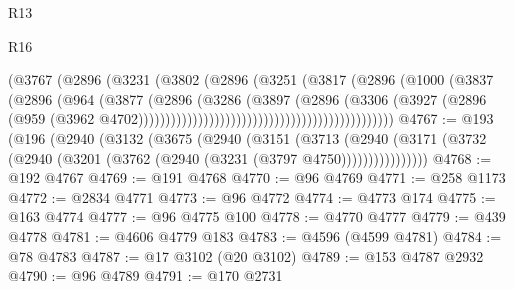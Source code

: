 \begin{lexlean}{R13}
\begin{lexlean}{R16}
\begin{coremodule}
{{{{{{{{{{{{{{{{{{{{{{{{{{{{{{{{{{{{{{{{{{{{{{{{{{{{{{{{{{{{{{{{{{{{{{{{{{{{{{{{{{{{{{{{{{{{{{{{{{{{{{{{{{{{{{{{{                                                      (@3767
                                                        (@2896
                                                          (@3231
                                                            (@3802
                                                              (@2896
                                                                (@3251
                                                                  (@3817
                                                                    (@2896
                                                                      (@1000
                                                                        (@3837
                                                                          (@2896
                                                                            (@964
                                                                              (@3877
                                                                                (@2896
                                                                                  (@3286
                                                                                    (@3897
                                                                                      (@2896
                                                                                        (@3306
                                                                                          (@3927
                                                                                            (@2896
                                                                                              (@959
                                                                                                (@3962
                                                                                                  @4702)))))))))))))))))))))))))))))))))))))))))))))))
@4767 := @193
    (@196
      (@2940
        (@3132
          (@3675
            (@2940
              (@3151
                (@3713
                  (@2940
                    (@3171 (@3732 (@2940 (@3201 (@3762 (@2940 (@3231 (@3797 @4750))))))))))))))))
@4768 := @192 @4767
@4769 := @191 @4768
@4770 := @96 @4769
@4771 := @258 @1173
@4772 := @2834 @4771
@4773 := @96 @4772
@4774 := @4773 @174
@4775 := @163 @4774
@4777 := @96 @4775 @100
@4778 := @4770 @4777
@4779 := @439 @4778
@4781 := @4606 @4779 @183
@4783 := @4596 (@4599 @4781)
@4784 := @78 @4783
@4787 := @17 @3102 (@20 @3102)
@4789 := @153 @4787 @2932
@4790 := @96 @4789
@4791 := @170 @2731
}}}}}}}}}}}}}}}}}}}}}}}}}}}}}}}}}}}}}}}}}}}}}}}}}}}}}}}}}}}}}}}}}}}}}}}}}}}}}}}}}}}}}}}}}}}}}}}}}}}}}}}}}}}}}}}}}
\end{coremodule}
\end{lexlean}
\end{lexlean}
